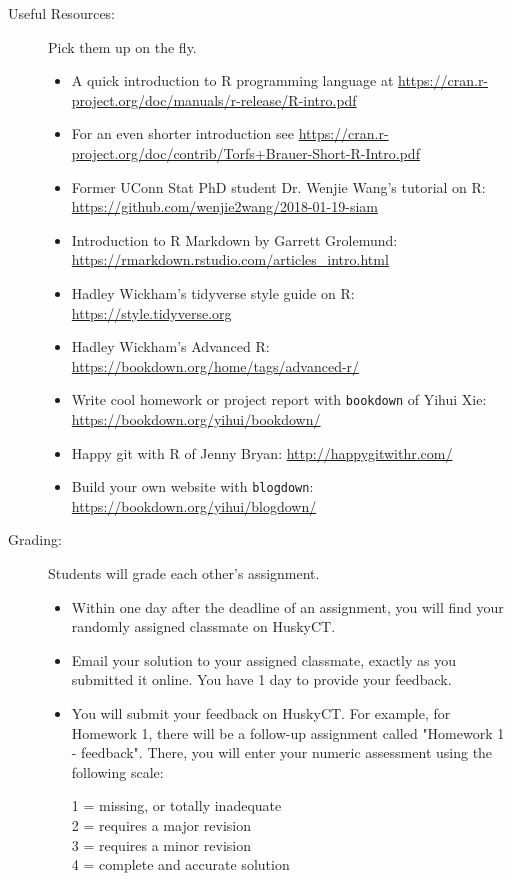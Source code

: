 \documentclass[twocolumn,hidelinks]{article}
\begin{document}
\begin{description}
\item[Useful Resources:] Pick them up on the fly.
\begin{itemize}[noitemsep]
\item
A quick introduction to R programming language at
\url{https://cran.r-project.org/doc/manuals/r-release/R-intro.pdf}
\item
For an even shorter introduction see
\url{https://cran.r-project.org/doc/contrib/Torfs+Brauer-Short-R-Intro.pdf}
\item
Former UConn Stat PhD student Dr. Wenjie Wang's tutorial on R:
\url{https://github.com/wenjie2wang/2018-01-19-siam}
\item
Introduction to R Markdown by Garrett Grolemund:
\url{https://rmarkdown.rstudio.com/articles_intro.html}
\item
Hadley Wickham's tidyverse style guide on R:
\url{https://style.tidyverse.org}
\item
Hadley Wickham's Advanced R:
\url{https://bookdown.org/home/tags/advanced-r/}
\item
Write cool homework or project report with \texttt{bookdown} of Yihui Xie:
\url{https://bookdown.org/yihui/bookdown/}
\item
Happy git with R of Jenny Bryan:
\url{http://happygitwithr.com/}
\item
Build your own website with \texttt{blogdown}:
\url{https://bookdown.org/yihui/blogdown/}
\end{itemize}

\item[Grading:] Students will grade each other's assignment.

\begin{itemize}
\item
  Within one day after the deadline of an assignment, you will find your
randomly assigned classmate on HuskyCT.

\item
Email your solution to your assigned classmate, exactly as you
submitted it online. You have 1 day to provide your feedback. 

\item
You will submit your feedback on HuskyCT. For example, for Homework
1, there will be a follow-up assignment called "Homework 1 -
feedback". There, you will enter your numeric assessment using the
following scale:

1 = missing, or totally inadequate\\
2 = requires a major revision\\
3 = requires a minor revision\\
4 = complete and accurate solution


\end{itemize}
\end{description}
\end{document}
